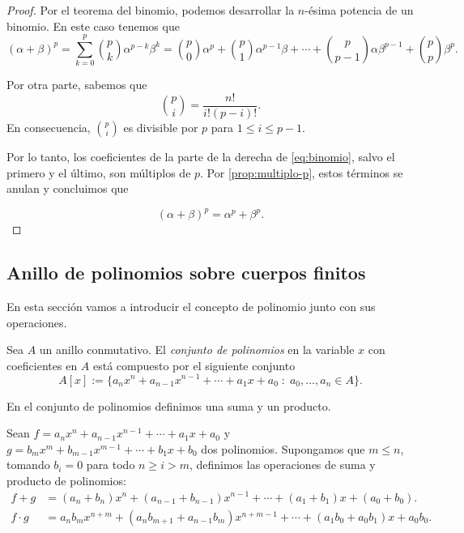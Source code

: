 \begin{proof}
    Por el teorema del binomio, podemos desarrollar la $n$-ésima potencia de un binomio. En este caso tenemos que
    \begin{equation}
        \label{eq:binomio}
        ( \alpha + \beta )^p
            =\sum_{k=0}^p {p \choose k}\alpha^{p-k} \beta^k
            ={p \choose 0}\alpha^p + {p\choose 1} \alpha^{p-1} \beta + \cdots + {p\choose p-1}\alpha \beta^{p-1} + {p \choose p} \beta^p.
    \end{equation}

    Por otra parte, sabemos que
    \[
        {p \choose i} = \frac{n!}{i! (p-i)!}. 
    \]
    En consecuencia, ${p \choose i}$ es divisible por $p$ para $1 \leq i \leq p-1$.

    Por lo tanto, los coeficientes de la parte de la derecha de \eqref{eq:binomio}, salvo el primero y el último, son múltiplos de $p$. Por \ref{prop:multiplo-p}, estos términos se anulan y concluimos que

    \begin{equation*}
        ( \alpha + \beta )^p = \alpha^p + \beta^p.
    \end{equation*}
\end{proof}



\subsection{Anillo de polinomios sobre cuerpos finitos}

En esta sección vamos a introducir el concepto de polinomio junto con sus operaciones.

\begin{definition}
    Sea $A$ un anillo conmutativo. El \emph{conjunto de polinomios} en la variable $x$ con coeficientes en $A$ está compuesto por el siguiente conjunto
    \[
        A[x] := \{ a_n x^n  + a_{n-1} x^{n-1} + \cdots + a_1 x + a_0 \; : \; a_0, ..., a_n \in A \}. 
    \]
\end{definition}

En el conjunto de polinomios definimos una suma y un producto. 

Sean $f = a_n x^n + a_{n-1} x^{n-1} + \cdots + a_1 x + a_0$ y $g = b_m x^m + b_{m-1} x^{m-1} + \cdots + b_1 x + b_0$ dos polinomios. Supongamos que $m \leq n$, tomando $b_i = 0$ para todo $n \geq i > m$, definimos las operaciones de suma y producto de polinomios:
\begin{align*}
    f + g       &= (a_n + b_n)x^n + (a_{n-1} + b_{n-1})x^{n-1} + \cdots + (a_1 + b_1)x + (a_0 + b_0).\\
    f \cdot g   &= a_n b_m x^{n+m} + (a_n b_{m+1} + a_{n-1} b_m) x^{n+m-1} + \cdots + (a_1 b_0 + a_0 b_1)x + a_0 b_0.
\end{align*} 

